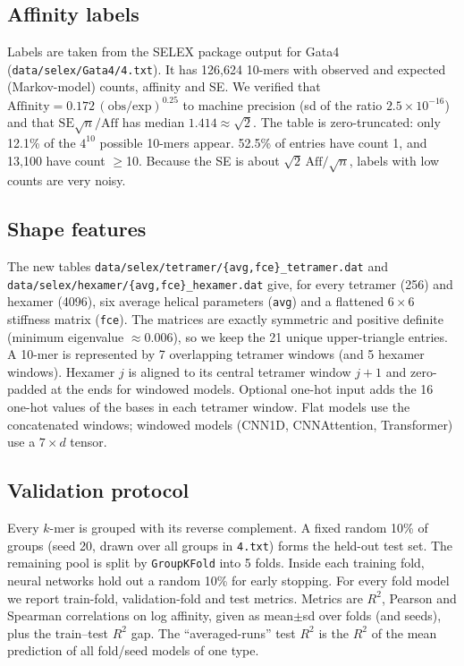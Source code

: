 \documentclass[11pt,a4paper]{article}
\begin{document}
\subsection{Affinity labels}
Labels are taken from the SELEX package output for Gata4 (\texttt{data/selex/Gata4/4.txt}). It has 126{,}624 10-mers with observed and expected (Markov-model) counts, affinity and SE. We verified that $\mathrm{Affinity}=0.172\,(\mathrm{obs}/\mathrm{exp})^{0.25}$ to machine precision (sd of the ratio $2.5\times10^{-16}$) and that $\mathrm{SE}\sqrt{n}/\mathrm{Aff}$ has median $1.414\approx\sqrt2$. The table is zero-truncated: only 12.1\% of the $4^{10}$ possible 10-mers appear. 52.5\% of entries have count 1, and 13{,}100 have count $\geq$10. Because the SE is about $\sqrt2\,\mathrm{Aff}/\sqrt n$, labels with low counts are very noisy.

\subsection{Shape features}
The new tables \texttt{data/selex/tetramer/\{avg,fce\}\_tetramer.dat} and \texttt{data/selex/hexamer/\{avg,fce\}\_hexamer.dat} give, for every tetramer (256) and hexamer (4096), six average helical parameters (\texttt{avg}) and a flattened $6\times6$ stiffness matrix (\texttt{fce}). The matrices are exactly symmetric and positive definite (minimum eigenvalue $\approx 0.006$), so we keep the 21 unique upper-triangle entries. A 10-mer is represented by 7 overlapping tetramer windows (and 5 hexamer windows). Hexamer $j$ is aligned to its central tetramer window $j{+}1$ and zero-padded at the ends for windowed models. Optional one-hot input adds the 16 one-hot values of the bases in each tetramer window. Flat models use the concatenated windows; windowed models (CNN1D, CNNAttention, Transformer) use a $7\times d$ tensor.




\subsection{Validation protocol}
Every $k$-mer is grouped with its reverse complement. A fixed random 10\% of groups (seed 20, drawn over all groups in \texttt{4.txt}) forms the held-out test set. The remaining pool is split by \texttt{GroupKFold} into 5 folds. Inside each training fold, neural networks hold out a random 10\% for early stopping. For every fold model we report train-fold, validation-fold and test metrics. Metrics are $R^2$, Pearson and Spearman correlations on log affinity, given as mean$\pm$sd over folds (and seeds), plus the train--test $R^2$ gap. The ``averaged-runs'' test $R^2$ is the $R^2$ of the mean prediction of all fold/seed models of one type.
\end{document}
